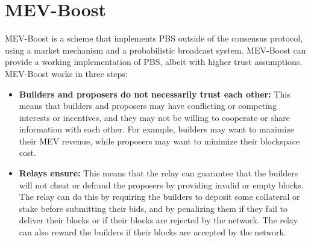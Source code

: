 \section{MEV-Boost}
MEV-Boost is a scheme that implements PBS outside of the consensus protocol, using a market mechanism and a probabilistic broadcast system. MEV-Boost can provide a working implementation of PBS, albeit with higher trust assumptions. MEV-Boost works in three steps:
\begin{itemize}
	\item \textbf{Builders and proposers do not necessarily trust each other:} This means that builders and proposers may have conflicting or competing interests or incentives, and they may not be willing to cooperate or share information with each other. For example, builders may want to maximize their MEV revenue, while proposers may want to minimize their blockspace cost.
	\item \textbf{Relays ensure:} This means that the relay can guarantee that the builders will not cheat or defraud the proposers by providing invalid or empty blocks. The relay can do this by requiring the builders to deposit some collateral or stake before submitting their bids, and by penalizing them if they fail to deliver their blocks or if their blocks are rejected by the network. The relay can also reward the builders if their blocks are accepted by the network.
\end{itemize}
